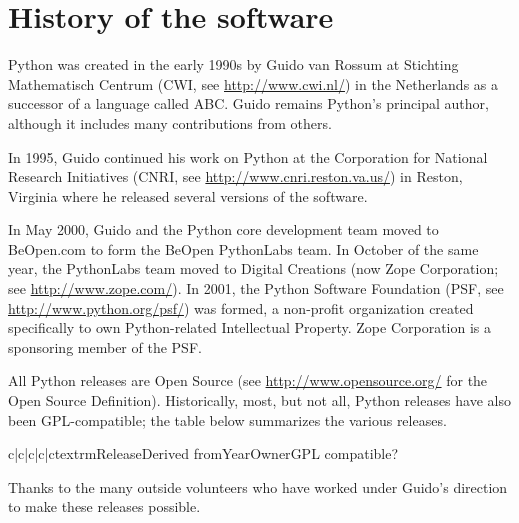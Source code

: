 \section{History of the software}

Python was created in the early 1990s by Guido van Rossum at Stichting
Mathematisch Centrum (CWI, see \url{http://www.cwi.nl/}) in the Netherlands
as a successor of a language called ABC.  Guido remains Python's
principal author, although it includes many contributions from others.

In 1995, Guido continued his work on Python at the Corporation for
National Research Initiatives (CNRI, see \url{http://www.cnri.reston.va.us/})
in Reston, Virginia where he released several versions of the
software.

In May 2000, Guido and the Python core development team moved to
BeOpen.com to form the BeOpen PythonLabs team.  In October of the same
year, the PythonLabs team moved to Digital Creations (now Zope
Corporation; see \url{http://www.zope.com/}).  In 2001, the Python
Software Foundation (PSF, see \url{http://www.python.org/psf/}) was
formed, a non-profit organization created specifically to own
Python-related Intellectual Property.  Zope Corporation is a
sponsoring member of the PSF.

All Python releases are Open Source (see
\url{http://www.opensource.org/} for the Open Source Definition).
Historically, most, but not all, Python releases have also been
GPL-compatible; the table below summarizes the various releases.

\begin{tablev}{c|c|c|c|c}{textrm}{Release}{Derived from}{Year}{Owner}{GPL compatible?}
\end{tablev}


Thanks to the many outside volunteers who have worked under Guido's
direction to make these releases possible.


